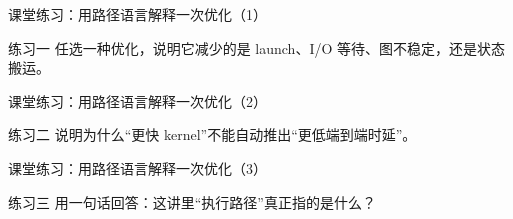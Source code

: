 \begin{frame}{课堂练习：用路径语言解释一次优化（1）}
\begin{block}{练习一}
    任选一种优化，说明它减少的是 launch、I/O 等待、图不稳定，还是状态搬运。
  \end{block}
\end{frame}

\begin{frame}{课堂练习：用路径语言解释一次优化（2）}
\begin{block}{练习二}
    说明为什么“更快 kernel”不能自动推出“更低端到端时延”。
  \end{block}
\end{frame}

\begin{frame}{课堂练习：用路径语言解释一次优化（3）}
\begin{block}{练习三}
    用一句话回答：这讲里“执行路径”真正指的是什么？
  \end{block}
\end{frame}
